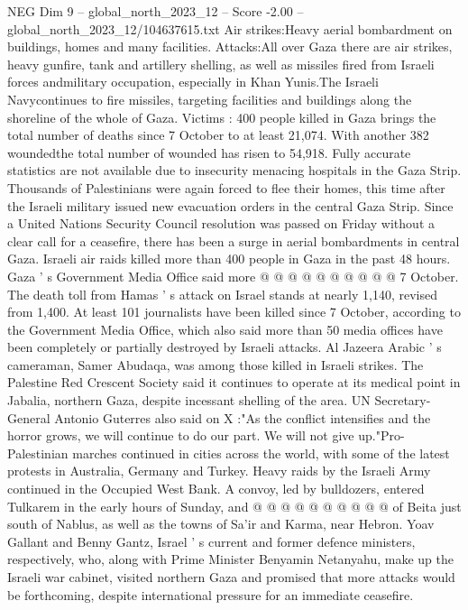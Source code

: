 \begin{textsample}{NEG Dim 9 – global\_north\_2023\_12 – Score -2.00 – global\_north\_2023\_12/104637615.txt}  \label{ex:f9_neg_293}
Air strikes:Heavy aerial bombardment on buildings, homes and many facilities.
Attacks:All over Gaza there are air strikes, heavy gunfire, tank and artillery shelling, as well as missiles fired from Israeli forces andmilitary occupation, especially in Khan Yunis.The Israeli Navycontinues to fire missiles, targeting facilities and buildings along the shoreline of the whole of Gaza.
Victims : 400 people killed in Gaza brings the total number of deaths since 7 October to at least 21,074.
With another 382 woundedthe total number of wounded has risen to 54,918.
Fully accurate statistics are not available due to insecurity menacing hospitals in the Gaza Strip.
Thousands of Palestinians were again forced to flee their homes, this time after the Israeli military issued new evacuation orders in the central Gaza Strip.
Since a United Nations Security Council resolution was passed on Friday without a clear call for a ceasefire, there has been a surge in aerial bombardments in central Gaza.
Israeli air raids killed more than 400 people in Gaza in the past 48 hours.
Gaza ' s Government Media Office said more @ @ @ @ @ @ @ @ @ @ 7 October.
The death toll from Hamas ' s attack on Israel stands at nearly 1,140, revised from 1,400.
At least 101 journalists have been killed since 7 October, according to the Government Media Office, which also said more than 50 media offices have been completely or partially destroyed by Israeli attacks.
Al Jazeera Arabic ' s cameraman, Samer Abudaqa, was among those killed in Israeli strikes.
The Palestine Red Crescent Society said it continues to operate at its medical point in Jabalia, northern Gaza, despite incessant shelling of the area.
UN Secretary-General Antonio Guterres also said on X :"As the conflict intensifies and the horror grows, we will continue to do our part.
We will not give up."Pro-Palestinian marches continued in cities across the world, with some of the latest protests in Australia, Germany and Turkey.
Heavy raids by the Israeli Army continued in the Occupied West Bank.
A convoy, led by bulldozers, entered Tulkarem in the early hours of Sunday, and @ @ @ @ @ @ @ @ @ @ of Beita just south of Nablus, as well as the towns of Sa'ir and Karma, near Hebron.
Yoav Gallant and Benny Gantz, Israel ' s current and former defence ministers, respectively, who, along with Prime Minister Benyamin Netanyahu, make up the Israeli war cabinet, visited northern Gaza and promised that more attacks would be forthcoming, despite international pressure for an immediate ceasefire.

\end{textsample}
